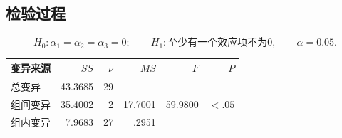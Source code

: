 \subsection{检验过程}
\[
H_0:\alpha_1=\alpha_2=\alpha_3=0;\qquad
H_1:\text{至少有一个效应项不为0},\qquad\alpha=0.05.
\]
\par\noindent\begin{minipage}{\linewidth}
\begin{center}\begin{tabular}{lrrrrr}
\toprule 变异来源&$SS$&$\nu$&$MS$&$F$&$P$\\\midrule
总变异&43.3685&29&&&\\
组间变异&35.4002&2&17.7001&59.9800&$<.05$\\
组内变异&7.9683&27&.2951&&\\\bottomrule
\end{tabular}\end{center}
\end{minipage}\par\medskip

